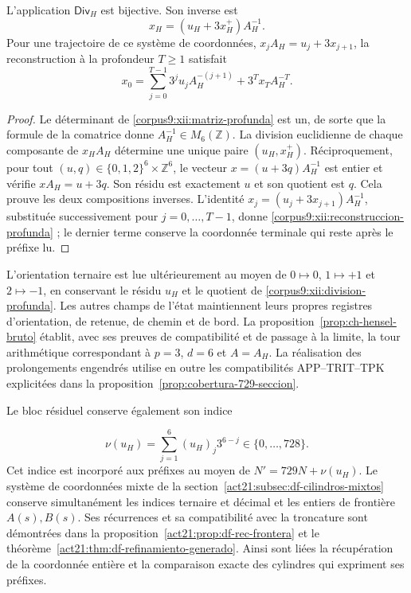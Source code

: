 \begin{proposition}
\label{corpus9:xii:inversion-profunda}
L’application \(\mathsf{Div}_H\) est bijective. Son inverse est
\begin{equation}
 x_H=(u_H+3x_H^+)A_H^{-1}.
 \label{corpus9:xii:inversa-profunda}
\end{equation}
Pour une trajectoire de ce système de coordonnées,
\(x_jA_H=u_j+3x_{j+1}\), la reconstruction à la profondeur
\(T\geq1\) satisfait
\begin{equation}
 x_0=\sum_{j=0}^{T-1}3^ju_jA_H^{-(j+1)}
                 +3^Tx_TA_H^{-T}.
 \label{corpus9:xii:reconstruccion-profunda}
\end{equation}
\end{proposition}
\begin{proof}
Le déterminant de \eqref{corpus9:xii:matriz-profunda} est un, de sorte que
la formule de la comatrice donne \(A_H^{-1}\in M_6(\mathbb Z)\).
La division euclidienne de chaque composante de \(x_HA_H\) détermine une
unique paire \((u_H,x_H^+)\). Réciproquement, pour tout
\((u,q)\in\{0,1,2\}^6\times\mathbb Z^6\), le vecteur
\(x=(u+3q)A_H^{-1}\) est entier et vérifie \(xA_H=u+3q\).
Son résidu est exactement \(u\) et son quotient est \(q\). Cela prouve
les deux compositions inverses. L’identité
\(x_j=(u_j+3x_{j+1})A_H^{-1}\), substituée successivement pour
\(j=0,\ldots,T-1\), donne
\eqref{corpus9:xii:reconstruccion-profunda} ; le dernier terme conserve
la coordonnée terminale qui reste après le préfixe lu.
\end{proof}

L’orientation ternaire est lue ultérieurement au moyen de
\(0\mapsto0\), \(1\mapsto+1\) et \(2\mapsto-1\), en conservant
le résidu \(u_H\) et le quotient de
\eqref{corpus9:xii:division-profunda}. Les autres champs de l’état
maintiennent leurs propres registres d’orientation, de retenue, de chemin et de bord.
La proposition~\ref{prop:ch-hensel-bruto} établit, avec ses preuves de
compatibilité et de passage à la limite, la tour arithmétique correspondant à
\(p=3\), \(d=6\) et \(A=A_H\). La réalisation des prolongements
engendrés utilise en outre les compatibilités APP--TRIT--TPK explicitées
dans la proposition~\ref{prop:cobertura-729-seccion}.

Le bloc résiduel conserve également son indice

\[
 \nu(u_H)=\sum_{j=1}^{6}(u_H)_j3^{6-j}\in\{0,\ldots,728\}.
\]
Cet indice est incorporé aux préfixes au moyen de
\(N'=729N+\nu(u_H)\). Le système de coordonnées mixte de la
section~\ref{act21:subsec:df-cilindros-mixtos} conserve simultanément
les indices ternaire et décimal et les entiers de frontière
\(A(s),B(s)\). Ses récurrences et sa compatibilité avec la troncature
sont démontrées dans la proposition~\ref{act21:prop:df-rec-frontera} et le
théorème~\ref{act21:thm:df-refinamiento-generado}. Ainsi sont liées la
récupération de la coordonnée entière et la comparaison exacte des
cylindres qui expriment ses préfixes.
